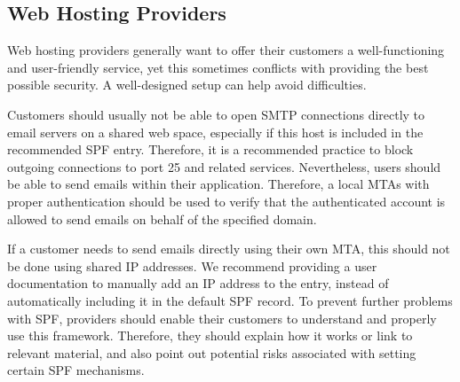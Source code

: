 \subsection{Web Hosting Providers}
\label{sec:recommendations_provider}

Web hosting providers generally want to offer their customers a well-functioning and user-friendly service, yet this sometimes conflicts with providing the best possible security.
A well-designed setup can help avoid difficulties.

Customers should usually not be able to open \ac{SMTP} connections directly to email servers on a shared web space, especially if this host is included in the recommended \ac{SPF} entry.
Therefore, it is a recommended practice to block outgoing connections to port 25 and related services.
Nevertheless, users should be able to send emails within their application.
Therefore, a local \acp{MTA} with proper authentication should be used to verify that the authenticated account is allowed to send emails on behalf of the specified domain.

If a customer needs to send emails directly using their own \ac{MTA}, this should not be done using shared IP addresses.
We recommend providing a user documentation to manually add an IP address to the entry, instead of automatically including it in the default \ac{SPF} record.
To prevent further problems with \ac{SPF}, providers should enable their customers to understand and properly use this framework.
Therefore, they should explain how it works or link to relevant material, and also point out potential risks associated with setting certain SPF mechanisms. 
